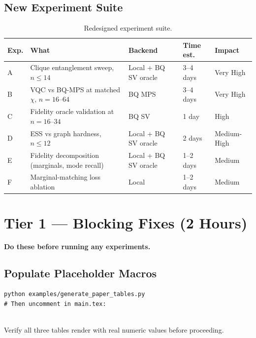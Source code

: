 \documentclass[11pt]{article}
\begin{document}
\subsection{New Experiment Suite}

\begin{table}[h]
\centering
\begin{tabular}{lllll}
\toprule
\textbf{Exp.} & \textbf{What} & \textbf{Backend} &
\textbf{Time est.} & \textbf{Impact} \\
\midrule
A & Clique entanglement sweep, $n \leq 14$
  & Local + BQ SV oracle & 3--4 days & Very High \\
B & VQC vs BQ-MPS at matched $\chi$, $n = 16$--$64$
  & BQ MPS & 3--4 days & Very High \\
C & Fidelity oracle validation at $n = 16$--$34$
  & BQ SV & 1 day & High \\
D & ESS vs graph hardness, $n \leq 12$
  & Local + BQ SV oracle & 2 days & Medium-High \\
E & Fidelity decomposition (marginals, mode recall)
  & Local + BQ SV oracle & 1--2 days & Medium \\
F & Marginal-matching loss ablation
  & Local & 1--2 days & Medium \\
\bottomrule
\end{tabular}
\caption{Redesigned experiment suite.}
\end{table}

\section{Tier 1 --- Blocking Fixes (2 Hours)}

\textcolor{tier1}{\textbf{Do these before running any experiments.}}

\subsection{Populate Placeholder Macros}

\begin{lstlisting}
python examples/generate_paper_tables.py
# Then uncomment in main.tex:


\end{lstlisting}

Verify all three tables render with real numeric values before
proceeding.
\end{document}
